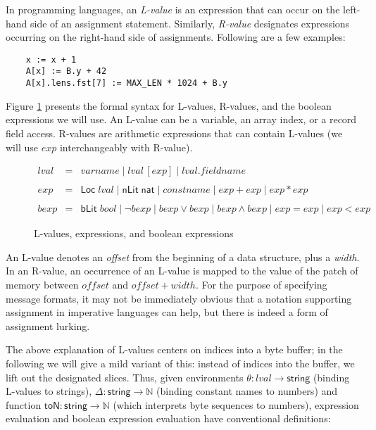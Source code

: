 \documentclass[sigplan,10pt,anonymous,review]{acmart}\settopmatter{printfolios=true,printccs=false,printacmref=false}
\newcommand{\konst}[1]{\ensuremath{\mathsf{#1}}}
\begin{document}
In programming languages, an \emph{L-value} is an expression that can
occur on the left-hand side of an assignment statement. Similarly,
\emph{R-value} designates expressions occurring on the right-hand side
of assignments. Following are a few examples:

\begin{verbatim}
    x := x + 1
    A[x] := B.y + 42
    A[x].lens.fst[7] := MAX_LEN * 1024 + B.y
\end{verbatim}

Figure \ref{Lvalues} presents the formal syntax for L-values, R-values,
and the boolean expressions we will use.  An L-value can be
a variable, an array index, or a record field access. R-values are
arithmetic expressions that can contain L-values (we will use
$\mathit{exp}$ interchangeably with R-value).

\begin{figure}
\[
\begin{array}{rcl}
\mathit{lval} & = & \mathit{varname} \mid
                    \mathit{lval} \, [ \mathit{exp} ] \mid
                    \mathit{lval} . \mathit{fieldname} \\
  & & \\
\mathit{exp} & = & \konst{Loc}\; \mathit{lval}
              \mid \konst{nLit}\; \konst{nat}
              \mid \mathit{constname}
              \mid \mathit{exp} + \mathit{exp}
              \mid \mathit{exp} * \mathit{exp} \\
  & & \\
\mathit{bexp} & = & \konst{bLit}\; bool
              \mid  \neg \mathit{bexp}
              \mid  \mathit{bexp} \lor \mathit{bexp}
              \mid  \mathit{bexp} \land \mathit{bexp}
              \mid  \mathit{exp} = \mathit{exp}
              \mid  \mathit{exp} < \mathit{exp}
\end{array}
\]
\caption{L-values, expressions, and boolean expressions}
\label{Lvalues}
\end{figure}

An L-value denotes an \emph{offset} from the beginning of a
data structure, plus a \emph{width}. In an R-value, an occurrence of an
L-value is mapped to the value of the patch of memory between
$\mathit{offset}$ and $\mathit{offset} + \mathit{width}$. For the
purpose of specifying message formats, it may not be immediately
obvious that a notation supporting assignment in imperative languages
can help, but there is indeed a form of assignment lurking.

The above explanation of L-values centers on indices into a byte
buffer; in the following we will give a mild variant of this: instead
of indices into the buffer, we lift out the designated slices. Thus, given
environments $\theta: \mathit{lval} \to \konst{string}$ (binding
L-values to strings), $\Delta : \konst{string} \to \mathbb{N}$
(binding constant names to numbers) and function
$\konst{toN}:\konst{string}\to\mathbb{N}$ (which interprets byte
sequences to numbers), expression evaluation and boolean expression
evaluation have conventional definitions:
\end{document}
